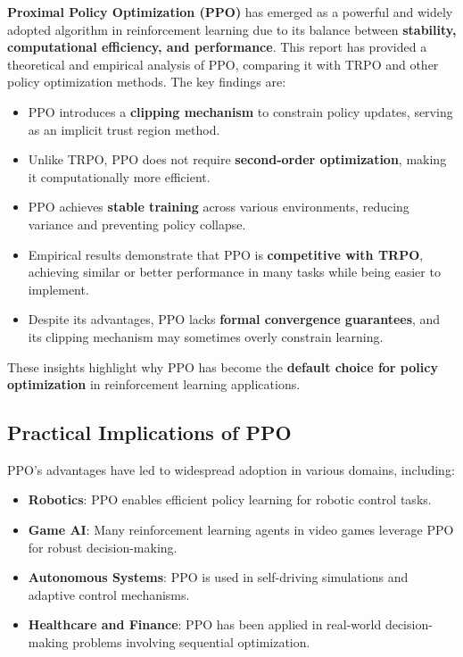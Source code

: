 \documentclass[12pt]{extreport} %
\begin{document}
\textbf{Proximal Policy Optimization (PPO)} has emerged as a powerful and widely adopted algorithm in reinforcement learning due to its balance between \textbf{stability, computational efficiency, and performance}. This report has provided a theoretical and empirical analysis of PPO, comparing it with TRPO and other policy optimization methods. The key findings are:

\begin{itemize}
    \item PPO introduces a \textbf{clipping mechanism} to constrain policy updates, serving as an implicit trust region method.
    \item Unlike TRPO, PPO does not require \textbf{second-order optimization}, making it computationally more efficient.
    \item PPO achieves \textbf{stable training} across various environments, reducing variance and preventing policy collapse.
    \item Empirical results demonstrate that PPO is \textbf{competitive with TRPO}, achieving similar or better performance in many tasks while being easier to implement.
    \item Despite its advantages, PPO lacks \textbf{formal convergence guarantees}, and its clipping mechanism may sometimes overly constrain learning.
\end{itemize}

These insights highlight why PPO has become the \textbf{default choice for policy optimization} in reinforcement learning applications.

\subsection{\textbf{Practical Implications of PPO}}

PPO's advantages have led to widespread adoption in various domains, including:

\begin{itemize}
    \item \textbf{Robotics}: PPO enables efficient policy learning for robotic control tasks.
    \item \textbf{Game AI}: Many reinforcement learning agents in video games leverage PPO for robust decision-making.
    \item \textbf{Autonomous Systems}: PPO is used in self-driving simulations and adaptive control mechanisms.
    \item \textbf{Healthcare and Finance}: PPO has been applied in real-world decision-making problems involving sequential optimization.
\end{itemize}
\end{document}
